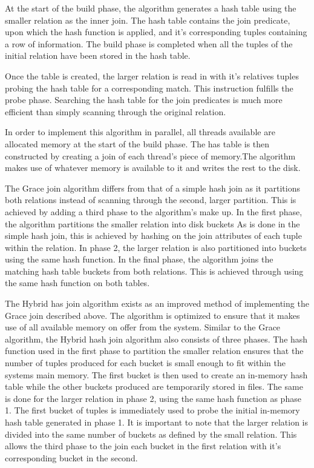 \documentclass[10pt,twocolumn]{witseiepaper}
\begin{document}
At the start of the build phase, the algorithm generates a hash table using the smaller relation as the inner join. The hash table contains the join predicate, upon which the hash function is applied, and it's corresponding tuples containing a row of information. The build phase is completed when all the tuples of the initial relation have been stored in the hash table. 

Once the table is created, the larger relation is read in with it's relatives tuples probing the hash table for a corresponding match. This instruction fulfills the probe phase. Searching the hash table for the join predicates is much more efficient than simply scanning through the original relation. 

In order to implement this algorithm in parallel, all threads available are allocated memory at the start of the build phase. The has table is then constructed by creating a join of each thread's piece of memory.The algorithm makes use of whatever memory is available to it and writes the rest to the disk.

The Grace join algorithm differs from that of a simple hash join as it partitions both relations instead of scanning through the second, larger partition. This is achieved by adding a third phase to the algorithm's make up. In the first phase, the algorithm partitions the smaller relation into disk buckets\cite{evaluating4JoinAlgorithms} As is done in the simple hash join, this is achieved by hashing on the join attributes of each tuple within the relation. In phase 2, the larger relation is also partitioned into buckets using the same hash function. In the final phase, the algorithm joins the matching hash table buckets from both relations. This is achieved through using the same hash function on both tables.

The Hybrid has join algorithm exists as an improved method of implementing the Grace join described above. The algorithm is optimized to ensure that it makes use of all available memory on offer from the system. Similar to the Grace algorithm, the Hybrid hash join algorithm also consists of three phases. The hash function used in the first phase to partition the smaller relation ensures that the number of tuples produced for each bucket is small enough to fit within the systems main memory\cite{evaluating4JoinAlgorithms}. The first bucket is then used to create an in-memory hash table while the other buckets produced are temporarily stored in files. The same is done for the larger relation in phase 2, using the same hash function as phase 1. The first bucket of tuples is immediately used to probe the initial in-memory hash table generated in phase 1. It is important to note that the larger relation is divided into the same number of buckets as defined by the small relation. This allows the third phase to the join each bucket in the first relation with it's corresponding bucket in the second. 
\end{document}
